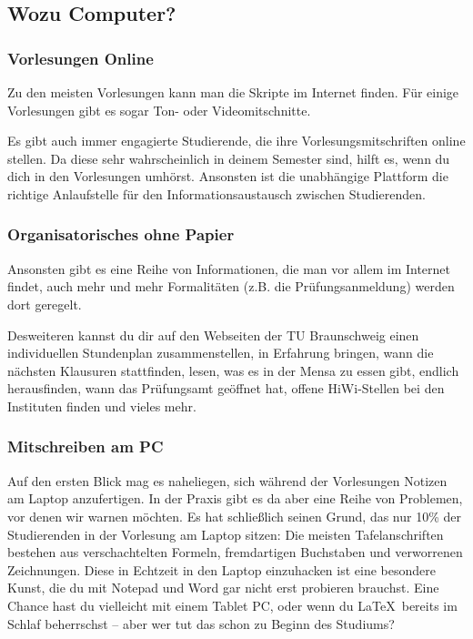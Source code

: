 
	\subsection{Wozu Computer?}
		\subsubsection{Vorlesungen Online}
			Zu den meisten Vorlesungen kann man die Skripte im Internet finden. Für einige Vorlesungen gibt es sogar Ton- oder Videomitschnitte.

			Es gibt auch immer engagierte Studierende, die ihre Vorlesungsmitschriften online stellen. Da diese sehr wahrscheinlich in deinem Semester sind, hilft es, wenn du dich in den Vorlesungen umhörst. Ansonsten ist die unabhängige Plattform  die richtige Anlaufstelle für den Informationsaustausch zwischen Studierenden.

		\subsubsection{Organisatorisches ohne Papier}
			Ansonsten gibt es eine Reihe von Informationen, die man vor allem im Internet findet, auch mehr und mehr Formalitäten (z.B. die Prüfungsanmeldung) werden dort geregelt.

			Desweiteren kannst du dir auf den Webseiten der TU Braunschweig einen individuellen Stundenplan zusammenstellen, in Erfahrung bringen, wann die nächsten Klausuren stattfinden, lesen, was es in der Mensa zu essen gibt, endlich herausfinden, wann das Prüfungsamt geöffnet hat,  offene HiWi-Stellen bei den Instituten finden und vieles mehr.

		\subsubsection{Mitschreiben am PC}
			Auf den ersten Blick mag es naheliegen, sich während der Vorlesungen Notizen am Laptop anzufertigen. In der Praxis gibt es da aber eine Reihe von Problemen, vor denen wir  warnen möchten. Es hat schließlich seinen Grund, das nur 10\% der Studierenden in der Vorlesung am Laptop sitzen: Die meisten Tafelanschriften bestehen  aus verschachtelten Formeln, fremdartigen Buchstaben und verworrenen Zeichnungen. Diese in Echtzeit in den Laptop einzuhacken ist eine besondere Kunst, die du mit Notepad und Word gar nicht erst probieren brauchst. Eine Chance hast du vielleicht mit einem Tablet PC, oder wenn du \LaTeX ~bereits im Schlaf beherrschst -- aber wer tut das schon zu Beginn des Studiums?

